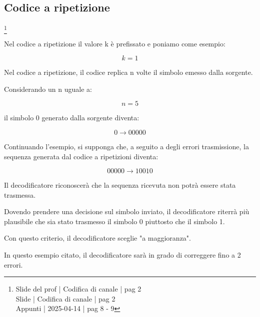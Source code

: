 \newpage 

\subsection{Codice a ripetizione}
\footnote{Slide del prof | Codifica di canale | pag 2 \\ 
Slide | Codifica di canale | pag  2\\
Appunti | 2025-04-14 | pag 8 - 9
} 

Nel codice a ripetizione il valore k è prefissato e poniamo come esempio: 

{
    \Large 
    \begin{equation}
        k = 1
    \end{equation}
}

Nel codice a ripetizione, il codice replica n volte il simbolo emesso dalla sorgente. \newline 

Considerando un n uguale a: 

{
    \Large 
    \begin{equation}
        n = 5
    \end{equation}
}

il simbolo 0 generato dalla sorgente diventa: 

{
    \Large 
    \begin{equation}
        0 \to 00000
    \end{equation}
}

Continuando l'esempio, 
si supponga che, a seguito a degli errori trasmissione, 
la sequenza generata dal codice a ripetizioni diventa: 

{
    \Large 
    \begin{equation}
        00000 \to 10010
    \end{equation}
}

Il decodificatore riconoscerà che la sequenza ricevuta non potrà essere stata trasmessa. \newline 

Dovendo prendere una decisione sul simbolo inviato, 
il decodificatore riterrà più plausibile che sia stato trasmesso il simbolo 0 piuttosto che il simbolo 1. \newline 

Con questo criterio, il decodificatore sceglie "a maggioranza". \newline 

In questo esempio citato, il decodificatore sarà in grado di correggere fino a 2 errori. \newline 

